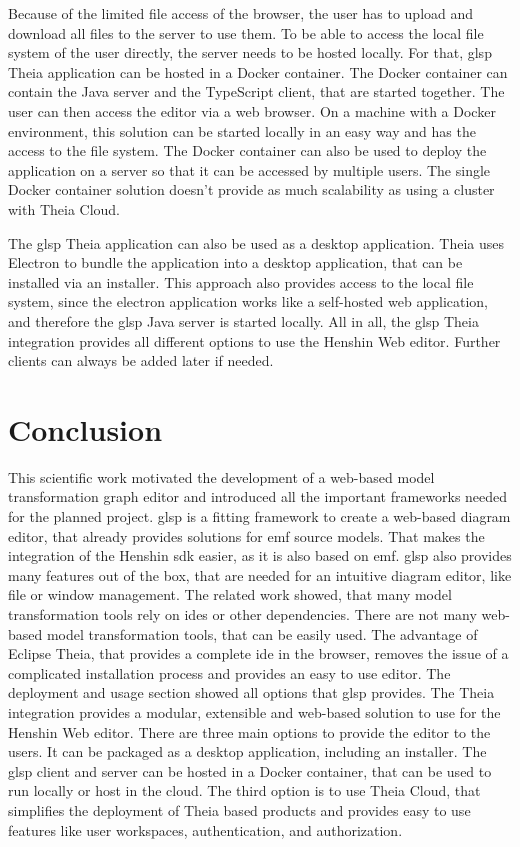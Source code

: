 \documentclass[conference,onecolumn]{IEEEtran}
\begin{document}
  Because of the limited file access of the browser, the user has to upload and download all files to the server to use them. To be able to access the local file system of the user directly, the server needs to be hosted locally. For that, \ac{glsp} Theia application can be hosted in a Docker container. \cite{docker} The Docker container can contain the Java server and the TypeScript client, that are started together. The user can then access the editor via a web browser. On a machine with a Docker environment, this solution can be started locally in an easy way and has the access to the file system. The Docker container can also be used to deploy the application on a server so that it can be accessed by multiple users. The single Docker container solution doesn't provide as much scalability as using a cluster with Theia Cloud.

  The \ac{glsp} Theia application can also be used as a desktop application. Theia uses Electron \cite{electron-repo} to bundle the application into a desktop application, that can be installed via an installer. This approach also provides access to the local file system, since the electron application works like a self-hosted web application, and therefore the \ac{glsp} Java server is started locally. All in all, the \ac{glsp} Theia integration provides all different options to use the Henshin Web editor. Further clients can always be added later if needed.

  \section{Conclusion}
  \label{sec:conclusion}
  This scientific work motivated the development of a web-based model transformation graph editor and introduced all the important frameworks needed for the planned project. \ac{glsp} is a fitting framework to create a web-based diagram editor, that already provides solutions for \ac{emf} source models. That makes the integration of the Henshin \acs{sdk} easier, as it is also based on \ac{emf}. \ac{glsp} also provides many features out of the box, that are needed for an intuitive diagram editor, like file or window management.
  The related work showed, that many model transformation tools rely on \acsp{ide} or other dependencies. There are not many web-based model transformation tools, that can be easily used. The advantage of Eclipse Theia, that provides a complete \acs{ide} in the browser, removes the issue of a complicated installation process and provides an easy to use editor.
  The deployment and usage section showed all options that \ac{glsp} provides. The Theia integration provides a modular, extensible and web-based solution to use for the Henshin Web editor. There are three main options to provide the editor to the users. It can be packaged as a desktop application, including an installer. The \ac{glsp} client and server can be hosted in a Docker container, that can be used to run locally or host in the cloud. The third option is to use Theia Cloud, that simplifies the deployment of Theia based products and provides easy to use features like user workspaces, authentication, and authorization.
\end{document}
